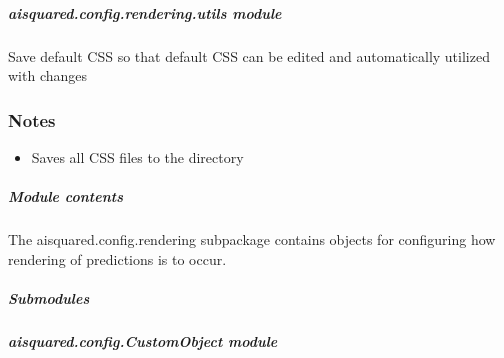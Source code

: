 \documentclass[letterpaper,10pt,english]{sphinxmanual}
\begin{document}
\subparagraph{aisquared.config.rendering.utils module}
\label{\detokenize{aisquared.config.rendering:module-aisquared.config.rendering.utils}}\label{\detokenize{aisquared.config.rendering:aisquared-config-rendering-utils-module}}

\begin{fulllineitems}
\label{\detokenize{aisquared.config.rendering:aisquared.config.rendering.utils.save_default_css}}
\pysigstartsignatures
{}
\pysigstopsignatures
\sphinxAtStartPar
Save default CSS so that default CSS can be edited and automatically utilized with changes
\subsubsection*{Notes}
\begin{itemize}
\item {} 
\sphinxAtStartPar
Saves all CSS files to the  directory

\end{itemize}

\end{fulllineitems}



\subparagraph{Module contents}
\label{\detokenize{aisquared.config.rendering:module-aisquared.config.rendering}}\label{\detokenize{aisquared.config.rendering:module-contents}}
\sphinxAtStartPar
The aisquared.config.rendering subpackage contains objects for configuring how rendering of predictions is to occur.


\subparagraph{Submodules}
\label{\detokenize{aisquared.config:submodules}}

\subparagraph{aisquared.config.CustomObject module}
\label{\detokenize{aisquared.config:module-aisquared.config.CustomObject}}\label{\detokenize{aisquared.config:aisquared-config-customobject-module}}
\end{document}
